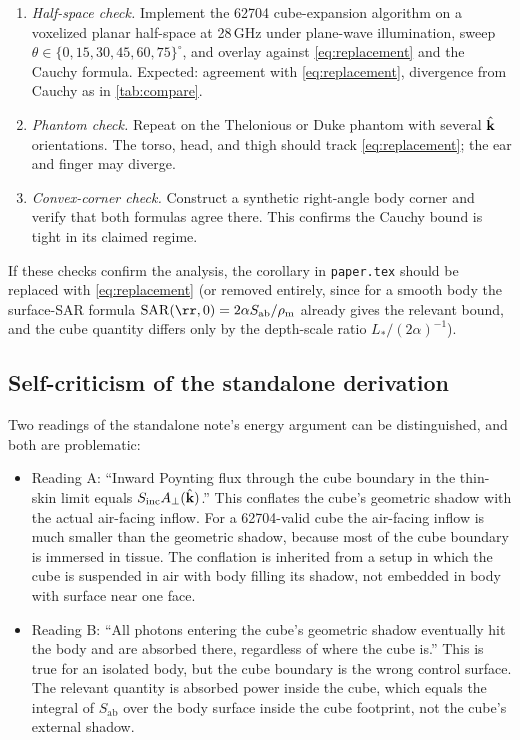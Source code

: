 \documentclass[11pt,a4paper]{article}
\theoremstyle{definition}
\theoremstyle{remark}
\newcommand{\Sab}{S_{\mathrm{ab}}}
\newcommand{\Sinc}{S_{\mathrm{inc}}}
\newcommand{\khat}{\hat{\vb{k}}}
\newcommand{\SAR}{\ensuremath{\mathrm{SAR}}}
\newcommand{\rhom}{\rho_{\mathrm{m}}}
\newcommand{\Lact}{L_{\!*}}
\begin{document}
\begin{enumerate}[nosep,leftmargin=2em]
  \item\emph{Half-space check.} Implement the 62704 cube-expansion
  algorithm on a voxelized planar half-space at 28\,GHz under
  plane-wave illumination, sweep $\theta\in\{0,15,30,45,60,75\}^\circ$,
  and overlay against \cref{eq:replacement} and the Cauchy formula.
  Expected: agreement with \cref{eq:replacement}, divergence from
  Cauchy as in \cref{tab:compare}.
  \item\emph{Phantom check.} Repeat on the Thelonious or Duke phantom
  with several $\khat$ orientations. The torso, head, and thigh
  should track \cref{eq:replacement}; the ear and finger may diverge.
  \item\emph{Convex-corner check.} Construct a synthetic right-angle
  body corner and verify that both formulas agree there. This
  confirms the Cauchy bound is tight in its claimed regime.
\end{enumerate}

If these checks confirm the analysis, the corollary in
\texttt{paper.tex} should be replaced with \cref{eq:replacement} (or
removed entirely, since for a smooth body the surface-SAR formula
$\SAR(\rr,0)=2\alpha\Sab/\rhom$ already gives the relevant bound,
and the cube quantity differs only by the depth-scale ratio
$\Lact/(2\alpha)^{-1}$).

\subsection{Self-criticism of the standalone derivation}

Two readings of the standalone note's energy argument can be
distinguished, and both are problematic:

\begin{itemize}[leftmargin=1.5em]
  \item Reading A: ``Inward Poynting flux through the cube boundary
  in the thin-skin limit equals $\Sinc A_\perp(\khat)$.'' This
  conflates the cube's geometric shadow with the actual air-facing
  inflow. For a 62704-valid cube the air-facing inflow is much smaller
  than the geometric shadow, because most of the cube boundary is
  immersed in tissue. The conflation is inherited from a setup in
  which the cube is suspended in air with body filling its shadow,
  not embedded in body with surface near one face.
  \item Reading B: ``All photons entering the cube's geometric
  shadow eventually hit the body and are absorbed there, regardless
  of where the cube is.'' This is true for an isolated body, but the
  cube boundary is the wrong control surface. The relevant quantity
  is absorbed power inside the cube, which equals the integral of
  $\Sab$ over the body surface inside the cube footprint, not the
  cube's external shadow.
\end{itemize}
\end{document}
